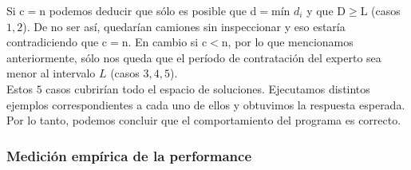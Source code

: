 \documentclass[11pt, a4paper, twoside]{article}
\begin{document}
Si c$=$n podemos deducir que sólo es posible que d$=$mín $d_i$ y que D$\ge$L (casos $1,2$). De no ser así, quedarían camiones sin inspeccionar y eso estaría contradiciendo que c$=$n. En cambio si c$<$n, por lo que mencionamos anteriormente, sólo nos queda que el período de contratación del experto sea menor al intervalo $L$ (casos $3,4,5$). \\
Estos $5$ casos cubrirían todo el espacio de soluciones. Ejecutamos distintos ejemplos correspondientes a cada uno de ellos y obtuvimos la respuesta esperada. Por lo tanto, podemos concluir que el comportamiento del programa es correcto. 

\subsubsection{Medición empírica de la performance}

\end{document}
